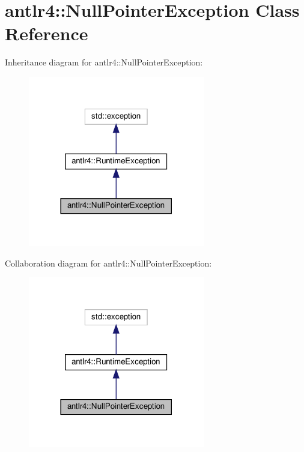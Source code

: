 \hypertarget{classantlr4_1_1NullPointerException}{}\section{antlr4\+:\+:Null\+Pointer\+Exception Class Reference}
\label{classantlr4_1_1NullPointerException}


Inheritance diagram for antlr4\+:\+:Null\+Pointer\+Exception\+:
\nopagebreak
\begin{figure}[H]
\begin{center}
\leavevmode
\includegraphics[width=218pt]{classantlr4_1_1NullPointerException__inherit__graph}
\end{center}
\end{figure}


Collaboration diagram for antlr4\+:\+:Null\+Pointer\+Exception\+:
\nopagebreak
\begin{figure}[H]
\begin{center}
\leavevmode
\includegraphics[width=218pt]{classantlr4_1_1NullPointerException__coll__graph}
\end{center}
\end{figure}

